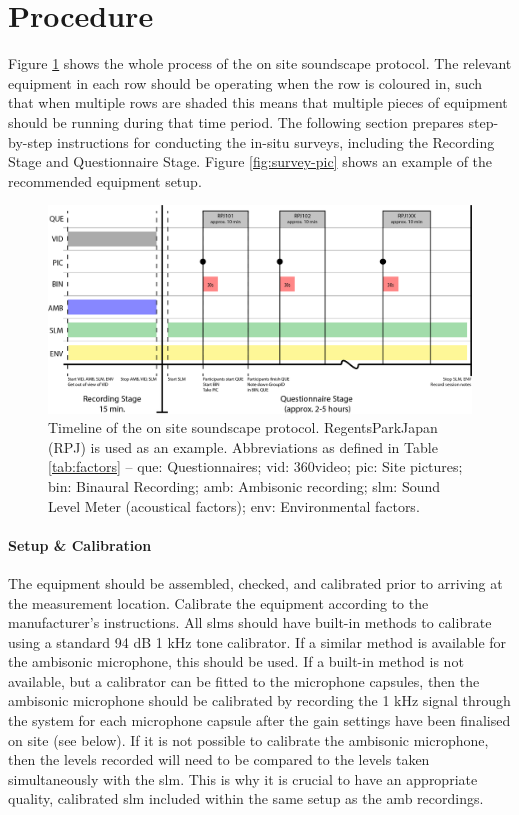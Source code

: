 \section{Procedure}
 \label{sec:proc}

 Figure \ref{fig:timeline} shows the whole process of the on site soundscape protocol. The relevant equipment in each row should be operating when the row is coloured in, such that when multiple rows are shaded this means that multiple pieces of equipment should be running during that time period. The following section prepares step-by-step instructions for conducting the in-situ surveys, including the Recording Stage and Questionnaire Stage. Figure \ref{fig:survey-pic} shows an example of the recommended equipment setup.

 \begin{figure}
   \centering
   \includegraphics[width=\textwidth]{Figures/Survey-Diagram_V2}
   \caption{Timeline of the on site soundscape protocol. RegentsParkJapan (RPJ) is used as an example. Abbreviations as defined in Table \ref{tab:factors} -- \gls{que}: Questionnaires; \gls{vid}: 360\degree video; \gls{pic}: Site pictures; \gls{bin}: Binaural Recording; \gls{amb}: Ambisonic recording; \gls{slm}: Sound Level Meter (acoustical factors); \gls{env}: Environmental factors.}
   \label{fig:timeline}
 \end{figure}

 \paragraph*{Setup \& Calibration} The equipment should be assembled, checked, and calibrated prior to arriving at the measurement location. Calibrate the equipment according to the manufacturer's instructions. All \gls{slm}s should have built-in methods to calibrate using a standard 94 dB 1 kHz tone calibrator. If a similar method is available for the ambisonic microphone, this should be used. If a built-in method is not available, but a calibrator can be fitted to the microphone capsules, then the ambisonic microphone should be calibrated by recording the 1 kHz signal through the system for each microphone capsule after the gain settings have been finalised on site (see below). If it is not possible to calibrate the ambisonic microphone, then the levels recorded will need to be compared to the levels taken simultaneously with the \gls{slm}. This is why it is crucial to have an appropriate quality, calibrated \gls{slm} included within the same setup as the \gls{amb} recordings.

